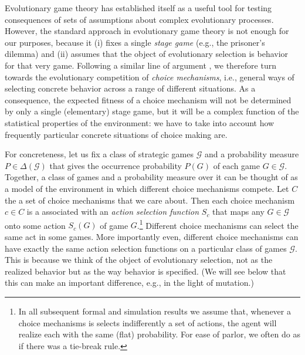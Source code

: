 \documentclass[fleqn,reqno,11pt]{article}
\begin{document}
Evolutionary game theory has established itself as a useful tool for testing consequences of
sets of assumptions about complex evolutionary processes. However, the standard approach in
evolutionary game theory is not enough for our purposes, because it (i) fixes a single
\emph{stage game} (e.g., the prisoner's dilemma) and (ii) assumes that the object of
evolutionary selection is behavior for that very game. Following a similar line of argument
\citep[e.g.][]{FawcettHamblin2013:Exposing-the-be}, we therefore turn towards the evolutionary
competition of \emph{choice mechanisms}, i.e., general ways of selecting concrete behavior
across a range of different situations. As a consequence, the expected fitness of a choice
mechanism will not be determined by only a single (elementary) stage game, but it will be a
complex function of the statistical properties of the environment: we have to take into account
how frequently particular concrete situations of choice making are.

For concreteness, let us fix a class of strategic games $\mathcal{G}$ and a probability measure
$P \in \Delta(\mathcal{G})$ that gives the occurrence probability $P(G)$ of each game
$G \in \mathcal{G}$. Together, a class of games and a probability measure over it can be
thought of as a model of the environment in which different choice mechanisms compete. Let $C$
the a set of choice mechanisms that we care about. Then each choice mechanism $c \in C$ is a
associated with an \emph{action selection function} $S_c$ that maps any $G \in \mathcal{G}$
onto some action $S_c(G)$ of game $G$.\footnote{In all subsequent formal and simulation results
  we assume that, whenever a choice mechanisms is selects indifferently a set of actions, the
  agent will realize each with the same (flat) probability. For ease of parlor, we often do as
  if there was a tie-break rule.} Different choice mechanisms can select the same act in some
games. More importantly even, different choice mechanisms can have exactly the same action
selection functions on a particular class of games $\mathcal{G}$. This is because we think of
the object of evolutionary selection, not as the realized behavior but as the way behavior is
specified. (We will see below that this can make an important difference, e.g., in the light of
mutation.)
\end{document}
